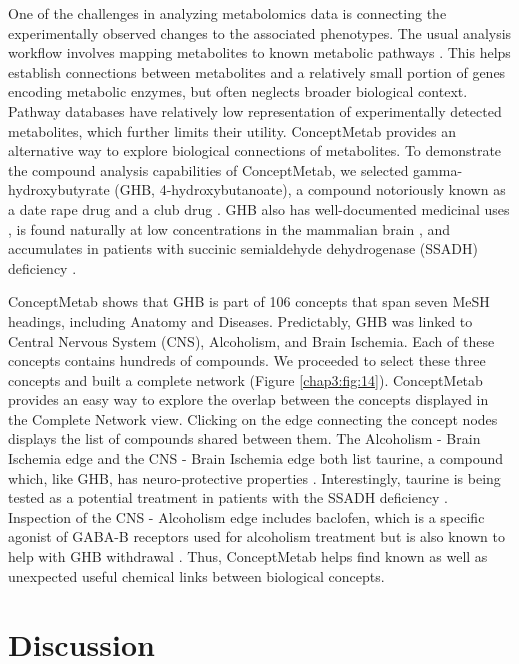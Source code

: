 One of the challenges in analyzing metabolomics data is connecting the experimentally observed changes to the associated phenotypes. The usual analysis workflow involves mapping metabolites to known metabolic pathways \cite{Lanza:2010jr}. This helps establish connections between metabolites and a relatively small portion of genes encoding metabolic enzymes, but often neglects broader biological context. Pathway databases have relatively low representation of experimentally detected metabolites, which further limits their utility. ConceptMetab provides an alternative way to explore biological connections of metabolites. To demonstrate the compound analysis capabilities of ConceptMetab, we selected gamma-hydroxybutyrate (GHB, 4-hydroxybutanoate), a compound notoriously known as a date rape drug \cite{Bendinskas:2011ea} and a club drug \cite{Gahlinger:2004ud}. GHB also has well-documented medicinal uses \cite{Mamelak:1986du}, is found naturally at low concentrations in the mammalian brain \cite{Vayer:1987cj}, and accumulates in patients with succinic semialdehyde dehydrogenase (SSADH) deficiency \cite{Pearl:2003dx}.

ConceptMetab shows that GHB is part of 106 concepts that span seven MeSH headings, including Anatomy and Diseases. Predictably, GHB was linked to Central Nervous System (CNS), Alcoholism, and Brain Ischemia. Each of these concepts contains hundreds of compounds. We proceeded to select these three concepts and built a complete network (Figure \ref{chap3:fig:14}). ConceptMetab provides an easy way to explore the overlap between the concepts displayed in the Complete Network view. Clicking on the edge connecting the concept nodes displays the list of compounds shared between them. The Alcoholism - Brain Ischemia edge and the CNS - Brain Ischemia edge both list taurine, a compound which, like GHB, has neuro-protective properties \cite{Shuaib:2002vq}. Interestingly, taurine is being tested as a potential treatment in patients with the SSADH deficiency \cite{Pearl:2014ct}. Inspection of the CNS - Alcoholism edge includes baclofen, which is a specific agonist of GABA-B receptors used for alcoholism treatment \cite{Addolorato:2000wz} but is also known to help with GHB withdrawal \cite{LeTourneau:2008gj}. Thus, ConceptMetab helps find known as well as unexpected useful chemical links between biological concepts.

\section{Discussion}
\label{conceptmetab_discussion}


